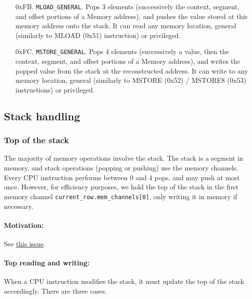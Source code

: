 \begin{enumerate}[align=left]
  \item[0xFB.] \texttt{MLOAD\_GENERAL}. Pops 3 elements (successively the context, segment, and offset portions of a Memory address), and pushes the value stored at this memory
  address onto the stack. It can read any memory location, general (similarly to MLOAD (0x51) instruction) or privileged.

  \item[0xFC.] \texttt{MSTORE\_GENERAL}. Pops 4 elements (successively a value, then the context, segment, and offset portions of a Memory address), and writes the popped value from
  the stack at the reconstructed address. It can write to any memory location, general (similarly to MSTORE (0x52) / MSTORE8 (0x53) instructions) or privileged.

\end{enumerate}


\subsection{Stack handling}

\subsubsection{Top of the stack}

The majority of memory operations involve the stack. The stack is a segment in memory, and stack operations (popping or pushing) use the memory channels.
Every CPU instruction performs between 0 and 4 pops, and may push at most once. However, for efficiency purposes, we hold the top of the stack in
the first memory channel \texttt{current\_row.mem\_channels[0]}, only writing it in memory if necessary.

\paragraph*{Motivation:}

See \href{https://github.com/0xPolygonZero/plonky2/issues/1149}{this issue}.

\paragraph*{Top reading and writing:}

When a CPU instruction modifies the stack, it must update the top of the stack accordingly. There are three cases.

